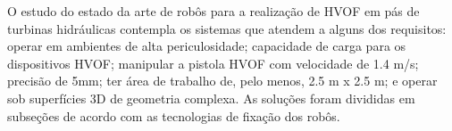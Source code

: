 O estudo do estado da arte de robôs para a realização de HVOF em pás de turbinas
hidráulicas contempla os sistemas que atendem a alguns dos requisitos: operar
em ambientes de alta periculosidade; capacidade de carga para os dispositivos HVOF;
manipular a pistola HVOF com velocidade de 1.4 m/s; precisão de 5mm; ter área de
trabalho de, pelo menos, 2.5 m x 2.5 m; e operar sob superfícies 3D de geometria
complexa. As soluções foram divididas em subseções de acordo com as tecnologias
de fixação dos robôs.



